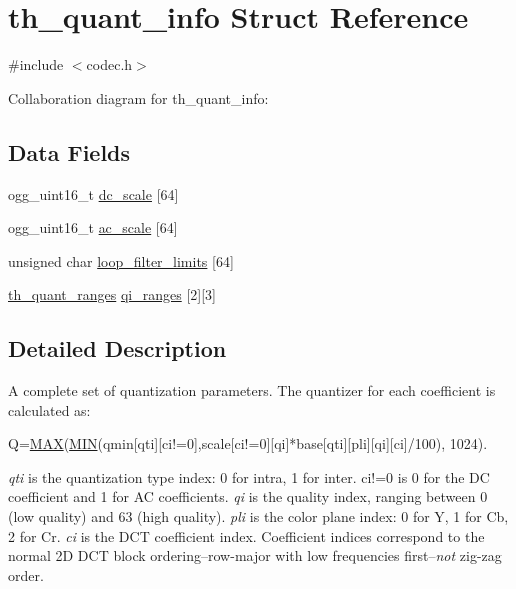 \hypertarget{structth__quant__info}{}\section{th\+\_\+quant\+\_\+info Struct Reference}
\label{structth__quant__info}


{\ttfamily \#include $<$codec.\+h$>$}



Collaboration diagram for th\+\_\+quant\+\_\+info\+:
\subsection*{Data Fields}
\begin{DoxyCompactItemize}
\item 
ogg\+\_\+uint16\+\_\+t \hyperlink{structth__quant__info_ad5c1c0d1aa4127fcf864ae747d732ed9}{dc\+\_\+scale} \mbox{[}64\mbox{]}
\item 
ogg\+\_\+uint16\+\_\+t \hyperlink{structth__quant__info_a102f079c8f4a135dc0895c10768aeb06}{ac\+\_\+scale} \mbox{[}64\mbox{]}
\item 
unsigned char \hyperlink{structth__quant__info_a4ac56bf0a45b5743b36daf85d5cd9e33}{loop\+\_\+filter\+\_\+limits} \mbox{[}64\mbox{]}
\item 
\hyperlink{structth__quant__ranges}{th\+\_\+quant\+\_\+ranges} \hyperlink{structth__quant__info_a6feacf4b365e305a7df7b93d87ee7bb8}{qi\+\_\+ranges} \mbox{[}2\mbox{]}\mbox{[}3\mbox{]}
\end{DoxyCompactItemize}


\subsection{Detailed Description}
A complete set of quantization parameters. The quantizer for each coefficient is calculated as\+: 
\begin{DoxyCode}
Q=\hyperlink{dumb_8h_aacc3ee1a7f283f8ef65cea31f4436a95}{MAX}(\hyperlink{dumb_8h_a74e75242132eaabbc1c512488a135926}{MIN}(qmin[qti][ci!=0],scale[ci!=0][qi]*base[qti][pli][qi][ci]/100),
 1024).
\end{DoxyCode}


{\itshape qti} is the quantization type index\+: 0 for intra, 1 for inter. {\ttfamily ci!=0} is 0 for the DC coefficient and 1 for AC coefficients. {\itshape qi} is the quality index, ranging between 0 (low quality) and 63 (high quality). {\itshape pli} is the color plane index\+: 0 for Y\textquotesingle{}, 1 for Cb, 2 for Cr. {\itshape ci} is the D\+CT coefficient index. Coefficient indices correspond to the normal 2D D\+CT block ordering--row-\/major with low frequencies first--{\itshape not} zig-\/zag order.

